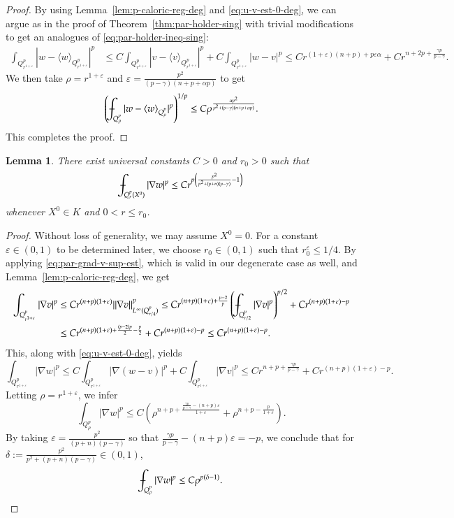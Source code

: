 \documentclass[11pt,oneside,english]{amsart}
\newcommand{\e}{\varepsilon}
\newcommand{\al}{\alpha}
\newcommand{\de}{\delta}
\newcommand{\D}{\nabla}
\numberwithin{equation}{section}
\def\Xint#1{\mathchoice
  {\XXint\displaystyle\textstyle{#1}}%
  {\XXint\textstyle\scriptstyle{#1}}%
  {\XXint\scriptstyle\scriptscriptstyle{#1}}%
  {\XXint\scriptscriptstyle\scriptscriptstyle{#1}}%
  \!\int}
\def\XXint#1#2#3{{\setbox0=\hbox{$#1{#2#3}{\int}$}
    \vcenter{\hbox{$#2#3$}}\kern-.5\wd0}}
\def\dashint{\Xint-}
\theoremstyle{plain}
\newtheorem{lemma}{Lemma}
\numberwithin{equation}{section}
\newcommand{\mean}[1]{\langle{#1}\rangle}
\begin{document}
\begin{proof}
By using Lemma~\ref{lem:p-caloric-reg-deg} and \eqref{eq:u-v-est-0-deg}, we can argue as in the proof of Theorem~\ref{thm:par-holder-sing} with trivial modifications to get an analogues of \eqref{eq:par-holder-ineq-sing}:
\begin{align*}
    \int_{Q^p_{r^{1+\e}}}|w-\mean{w}_{Q^p_{r^{1+\e}}}|^p&\le C\int_{Q^p_{r^{1+\e}}}|v-\mean{v}_{Q^p_{r^{1+\e}}}|^p+C\int_{Q^p_{r^{1+\e}}}|w-v|^p\le Cr^{(1+\e)(n+p)+p\e\al}+Cr^{n+2p+\frac{\gamma p}{p-\gamma}}.
\end{align*}
We then take $\rho=r^{1+\e}$ and $\e=\frac{p^2}{(p-\gamma)(n+p+\al p)}$ to get
$$
\left(\dashint_{Q_\rho^p}|w-\mean{w}_{Q_\rho^p}|^p\right)^{1/p}\le C\rho^{\frac{\al p^2}{p^2+(p-\gamma)(n+p+\al p) }}.
$$
This completes the proof.   
\end{proof}

 



\begin{lemma}
    \label{lem:par-u-est-initial-deg}
    There exist universal constants $C>0$ and $r_0>0$ such that
    $$
    \dashint_{Q_r^p(X^0)}|\D w|^p\le Cr^{p\left(\frac{p^2}{p^2+(p+n)(p-\gamma)}-1 \right)}
    $$
    whenever $X^0\in K$ and $0<r\le r_0$.
\end{lemma}

\begin{proof}
Without loss of generality, we may assume $X^0=0$. For a constant $\e\in(0,1)$ to be determined later, we choose $r_0\in(0,1)$ such that $r_0^\e\le 1/4$. By applying \eqref{eq:par-grad-v-sup-est}, which is valid in our degenerate case as well, and Lemma~\ref{lem:p-caloric-reg-deg}, we get
\begin{align*}
    \int_{Q^p_{r^{1+\e}}}|\D v|^p&\le Cr^{(n+p)(1+\e)}\|\D v\|_{L^\infty(Q^p_{r/4})}^p\le Cr^{(n+p)(1+\e)+\frac{p-2}p}\left(\dashint_{Q_{r/2}^p}|\D v|^p\right)^{p/2}+Cr^{(n+p)(1+\e)-p}\\
    &\le Cr^{(n+p)(1+\e)+\frac{(p-2)p}2-\frac p2}+Cr^{(n+p)(1+\e)-p}\le Cr^{(n+p)(1+\e)-p}.
\end{align*}
This, along with \eqref{eq:u-v-est-0-deg}, yields
$$
\int_{Q^p_{r^{1+\e}}}|\D w|^p\le C\int_{Q^p_{r^{1+\e}}}|\D(w-v)|^p+C\int_{Q^p_{r^{1+\e}}}|\D v|^p\le Cr^{n+p+\frac{\gamma p}{p-\gamma}}+Cr^{(n+p)(1+\e)-p}.
$$
Letting $\rho=r^{1+\e}$, we infer
$$
\int_{Q_\rho^p}|\D w|^p\le C\left(\rho^{n+p+\frac{\frac{\gamma p}{p-\gamma}-(n+p)\e }{1+\e}}+\rho^{n+p-\frac{p}{1+\e}}\right).
$$
By taking $\e=\frac{p^2}{(p+n)(p-\gamma)}$ so that $\frac{\gamma p}{p-\gamma}-(n+p)\e=-p$, we conclude that for $\de:=\frac{p^2}{p^2+(p+n)(p-\gamma)}\in(0,1)$,
\begin{equation*}
    \dashint_{Q_\rho^p}|\D w|^p\le C\rho^{p(\de-1) }.\qedhere
\end{equation*}
\end{proof}
\end{document}

